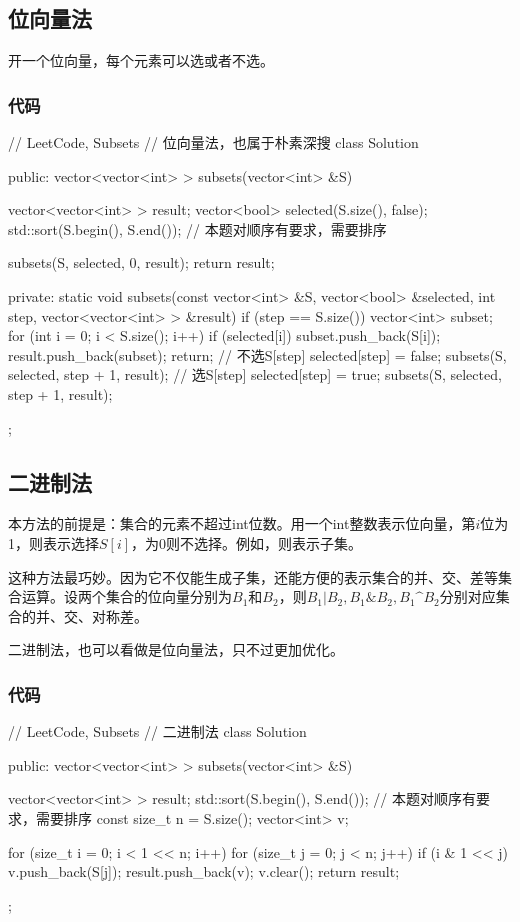 \subsection{位向量法}
开一个位向量，每个元素可以选或者不选。


\subsubsection{代码}
\begin{Code}
// LeetCode, Subsets
// 位向量法，也属于朴素深搜
class Solution {
public:
    vector<vector<int> > subsets(vector<int> &S) {
        vector<vector<int> > result;
        vector<bool> selected(S.size(), false);
        std::sort(S.begin(), S.end()); // 本题对顺序有要求，需要排序

        subsets(S, selected, 0, result);
        return result;
    }

private:
    static void subsets(const vector<int> &S, vector<bool> &selected, int step,
            vector<vector<int> > &result) {
        if (step == S.size()) {
            vector<int> subset;
            for (int i = 0; i < S.size(); i++) {
                if (selected[i]) subset.push_back(S[i]);
            }
            result.push_back(subset);
            return;
        }
        // 不选S[step]
        selected[step] = false;
        subsets(S, selected, step + 1, result);
        // 选S[step]
        selected[step] = true;
        subsets(S, selected, step + 1, result);
    }
};
\end{Code}


\subsection{二进制法}
本方法的前提是：集合的元素不超过int位数。用一个int整数表示位向量，第$i$位为1，则表示选择$S[i]$，为0则不选择。例如，则表示子集。

这种方法最巧妙。因为它不仅能生成子集，还能方便的表示集合的并、交、差等集合运算。设两个集合的位向量分别为$B_1$和$B_2$，则$B_1|B_2, B_1 \& B_2, B_1 \^ B_2$分别对应集合的并、交、对称差。

二进制法，也可以看做是位向量法，只不过更加优化。

\subsubsection{代码}
\begin{Code}
// LeetCode, Subsets
// 二进制法
class Solution {
public:
    vector<vector<int> > subsets(vector<int> &S) {
        vector<vector<int> > result;
        std::sort(S.begin(), S.end()); // 本题对顺序有要求，需要排序
        const size_t n = S.size();
        vector<int> v;

        for (size_t i = 0; i < 1 << n; i++) {
            for (size_t j = 0; j < n; j++) {
                if (i & 1 << j) v.push_back(S[j]);
            }
            result.push_back(v);
            v.clear();
        }
        return result;
    }
};
\end{Code}


